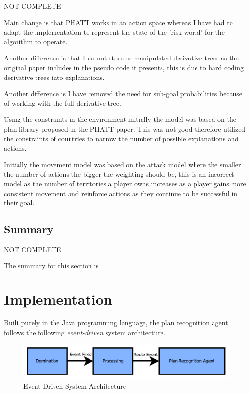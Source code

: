 \documentclass[parskip]{cs4rep}
\begin{document}
NOT COMPLETE

Main change is that PHATT works in an action space whereas I have had to adapt the implementation to represent the state of the 'risk world' for the algorithm to operate.

Another difference is that I do not store or manipulated derivative trees as the original paper includes in the pseudo code it presents, this is due to hard coding derivative trees into explanations.

Another difference is I have removed the need for sub-goal probabilities because of working with the full derivative tree.

Using the constraints in the environment initially the model was based on the plan library proposed in the PHATT paper. This was not good therefore utilized the constraints of countries to narrow the number of possible explanations and actions.

Initially the movement model was based on the attack model where the smaller the number of actions the bigger the weighting should be, this is an incorrect model as the number of territories a player owns increases as a player gains more consistent movement and reinforce actions as they continue to be successful in their goal.

\section{Summary}

NOT COMPLETE

The summary for this section is

\chapter{Implementation}

Built purely in the Java programming language, the plan recognition agent follows the following \textit{event-driven} system architecture.

\begin{figure}[h]
\centering
\includegraphics{images/event-architecture_cropped}
\caption{Event-Driven System Architecture}
\end{figure} 
\end{document}
